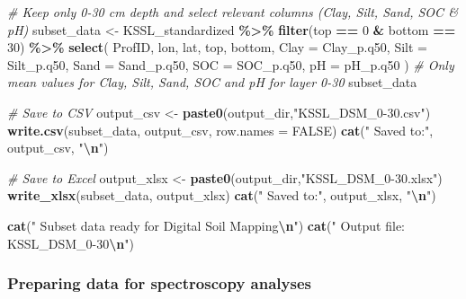 \documentclass[
  10pt,
  b5paper,
  oneside]{book}
\newenvironment{Shaded}{\begin{snugshade}}{\end{snugshade}}
\newcommand{\AttributeTok}[1]{\textcolor[rgb]{0.13,0.29,0.53}{#1}}
\newcommand{\CommentTok}[1]{\textcolor[rgb]{0.56,0.35,0.01}{\textit{#1}}}
\newcommand{\ConstantTok}[1]{\textcolor[rgb]{0.56,0.35,0.01}{#1}}
\newcommand{\DecValTok}[1]{\textcolor[rgb]{0.00,0.00,0.81}{#1}}
\newcommand{\FunctionTok}[1]{\textcolor[rgb]{0.13,0.29,0.53}{\textbf{#1}}}
\newcommand{\NormalTok}[1]{#1}
\newcommand{\OtherTok}[1]{\textcolor[rgb]{0.56,0.35,0.01}{#1}}
\newcommand{\SpecialCharTok}[1]{\textcolor[rgb]{0.81,0.36,0.00}{\textbf{#1}}}
\newcommand{\StringTok}[1]{\textcolor[rgb]{0.31,0.60,0.02}{#1}}
\begin{document}
\begin{Shaded}
\begin{Highlighting}[]
\CommentTok{\# Keep only 0{-}30 cm depth and select relevant columns (Clay, Silt, Sand, SOC \& pH)}
\NormalTok{subset\_data }\OtherTok{\textless{}{-}}\NormalTok{ KSSL\_standardized }\SpecialCharTok{\%\textgreater{}\%}
  \FunctionTok{filter}\NormalTok{(top }\SpecialCharTok{==} \DecValTok{0} \SpecialCharTok{\&}\NormalTok{ bottom }\SpecialCharTok{==} \DecValTok{30}\NormalTok{) }\SpecialCharTok{\%\textgreater{}\%}
  \FunctionTok{select}\NormalTok{(}
\NormalTok{    ProfID,}
\NormalTok{    lon,}
\NormalTok{    lat,}
\NormalTok{    top,}
\NormalTok{    bottom,}
    \AttributeTok{Clay =}\NormalTok{ Clay\_p.q50,}
    \AttributeTok{Silt =}\NormalTok{ Silt\_p.q50,}
    \AttributeTok{Sand =}\NormalTok{ Sand\_p.q50,}
    \AttributeTok{SOC =}\NormalTok{ SOC\_p.q50,}
    \AttributeTok{pH =}\NormalTok{ pH\_p.q50}
\NormalTok{  )}
\CommentTok{\# Only mean values for Clay, Silt, Sand, SOC and pH for layer 0{-}30}
\NormalTok{subset\_data}

\CommentTok{\# Save to CSV}
\NormalTok{output\_csv }\OtherTok{\textless{}{-}} \FunctionTok{paste0}\NormalTok{(output\_dir,}\StringTok{"KSSL\_DSM\_0{-}30.csv"}\NormalTok{)}
\FunctionTok{write.csv}\NormalTok{(subset\_data, output\_csv, }\AttributeTok{row.names =} \ConstantTok{FALSE}\NormalTok{)}
\FunctionTok{cat}\NormalTok{(}\StringTok{" Saved to:"}\NormalTok{, output\_csv, }\StringTok{"}\SpecialCharTok{\textbackslash{}n}\StringTok{"}\NormalTok{)}

\CommentTok{\# Save to Excel}
\NormalTok{output\_xlsx }\OtherTok{\textless{}{-}} \FunctionTok{paste0}\NormalTok{(output\_dir,}\StringTok{"KSSL\_DSM\_0{-}30.xlsx"}\NormalTok{)}
\FunctionTok{write\_xlsx}\NormalTok{(subset\_data, output\_xlsx)}
\FunctionTok{cat}\NormalTok{(}\StringTok{" Saved to:"}\NormalTok{, output\_xlsx, }\StringTok{"}\SpecialCharTok{\textbackslash{}n}\StringTok{"}\NormalTok{)}

\FunctionTok{cat}\NormalTok{(}\StringTok{" Subset data ready for Digital Soil Mapping}\SpecialCharTok{\textbackslash{}n}\StringTok{"}\NormalTok{)}
\FunctionTok{cat}\NormalTok{(}\StringTok{"  Output file: KSSL\_DSM\_0{-}30}\SpecialCharTok{\textbackslash{}n}\StringTok{"}\NormalTok{)}
\end{Highlighting}
\end{Shaded}

\subsubsection{Preparing data for spectroscopy analyses}\label{preparing-data-for-spectroscopy-analyses}
\end{document}

